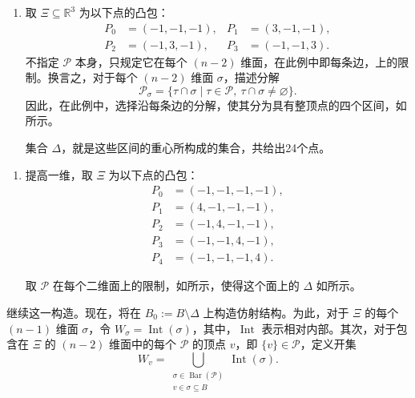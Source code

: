 \begin{example}\label{ex:6.74}
\begin{enumerate}[label=(\arabic*)]
\item 取 $\Xi\subseteq\mathbb R^3$ 为以下点的凸包：
\[
\begin{aligned}
P_0&=(-1,-1,-1),&P_1&=(3,-1,-1),\\
P_2&=(-1,3,-1),&P_3&=(-1,-1,3).
\end{aligned}
\]
不指定 $\mathcal P$ 本身，只规定它在每个 $(n-2)$ 维面，在此例中即每条边，上的限制。换言之，对于每个 $(n-2)$ 维面 $\sigma$，描述分解
\[
\mathcal P_\sigma
=\{\tau\cap\sigma\mid\tau\in\mathcal P,\ \tau\cap\sigma\ne\varnothing\}.
\]
因此，在此例中，选择沿每条边的分解，使其分为具有整顶点的四个区间，如所示。
\begin{figure}[H]
\centering
{}
\BookNumberOnlyCaption\label{fig:6.1}
\end{figure}
集合 $\Delta$，就是这些区间的重心所构成的集合，共给出24个点。
\end{enumerate}

\begin{enumerate}[label=(\arabic*),start=2]
\item 提高一维，取 $\Xi$ 为以下点的凸包：
\[
\begin{aligned}
P_0&=(-1,-1,-1,-1),\\
P_1&=(4,-1,-1,-1),\\
P_2&=(-1,4,-1,-1),\\
P_3&=(-1,-1,4,-1),\\
P_4&=(-1,-1,-1,4).
\end{aligned}
\]
\begin{figure}[H]
\centering
{}
\BookNumberOnlyCaption\label{fig:6.2}
\end{figure}
取 $\mathcal P$ 在每个二维面上的限制，如所示，使得这个面上的 $\Delta$ 如所示。
\begin{figure}[H]
\centering
{}
\BookNumberOnlyCaption\label{fig:6.3}
\end{figure}
\end{enumerate}
\end{example}

继续这一构造。现在，将在 $B_0:=B\setminus\Delta$ 上构造仿射结构。为此，对于 $\Xi$ 的每个 $(n-1)$ 维面 $\sigma$，令 $W_\sigma=\operatorname{Int}(\sigma)$，其中，$\operatorname{Int}$ 表示相对内部。其次，对于包含在 $\Xi$ 的 $(n-2)$ 维面中的每个 $\mathcal P$ 的顶点 $v$，即 $\{v\}\in\mathcal P$，定义开集
\[
W_v=\bigcup_{\substack{\sigma\in\operatorname{Bar}(\mathcal P)\\v\in\sigma\subseteq B}}
\operatorname{Int}(\sigma).
\]

